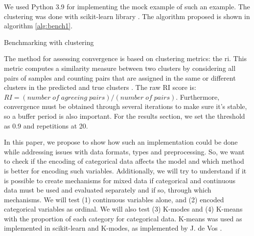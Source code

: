 We used Python 3.9 for implementing the mock example of such an example. The clustering was done with scikit-learn library \cite{scikit-learn}. The algorithm proposed is shown in algorithm \ref{alg:bench1}.

\begin{algorithm}[hbtp]
\caption{Benchmarking with clustering}
\label{alg:bench1}

\SetAlgoLined






\end{algorithm}

The method for assessing convergence is based on clustering metrics: the \ac{ri}. This metric computes a similarity measure between two clusters by considering all pairs of samples and counting pairs that are assigned in the same or different clusters in the predicted and true clusters \cite{hubertComparingPartitions1985}. The raw RI score is: $RI = (number\; of\; agreeing\; pairs) / (number\; of\; pairs)$.
Furthermore, convergence must be obtained through several iterations to make sure it's stable, so a buffer period is also important. For the results section, we set the threshold as 0.9 and repetitions at 20.

In this paper, we propose to show how such an implementation could be done while addressing issues with data formats, types and preprocessing. So, we want to check if the encoding of categorical data affects the model and which method is better for encoding such variables. Additionally, we will try to understand if it is possible to create mechanisms for mixed data if categorical and continuous data must be used and evaluated separately and if so, through which mechanisms.
We will test (1) continuous variables alone, and (2) encoded categorical variables as ordinal. We will also test (3) K-modes  and (4) K-means with the proportion of each category for categorical data.
K-means was used as implemented in scikit-learn \cite{scikit-learn} and K-modes, as implemented by J. de Vos \cite{devos2015}.
